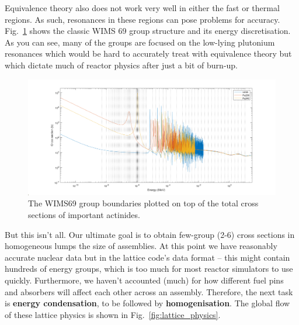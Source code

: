 \documentclass{article}
\begin{document}
Equivalence theory also does not work very well in either the fast or thermal regions. As such, resonances in these regions can pose problems for accuracy. Fig.~\ref{fig:WIMS} shows the classic WIMS 69 group structure and its energy discretisation. As you can see, many of the groups are focused on the low-lying plutonium resonances which would be hard to accurately treat with equivalence theory but which dictate much of reactor physics after just a bit of burn-up.

\begin{figure}[h!]
	\centering
	\includegraphics[scale=0.3]{./images/cross_sections_WIMS69.png} 
	\caption{The WIMS69 group boundaries plotted on top of the total cross sections of important actinides.} 
	\label{fig:WIMS}
\end{figure}

But this isn't all. Our ultimate goal is to obtain few-group (2-6) cross sections in homogeneous lumps the size of assemblies. At this point we have reasonably accurate nuclear data but in the lattice code's data format -- this might contain hundreds of energy groups, which is too much for most reactor simulators to use quickly. Furthermore, we haven't accounted (much) for how different fuel pins and absorbers will affect each other across an assembly. Therefore, the next task is \textbf{energy condensation}, to be followed by \textbf{homogenisation}. The global flow of these lattice physics is shown in Fig.~\ref{fig:lattice_physics}.
\end{document}
